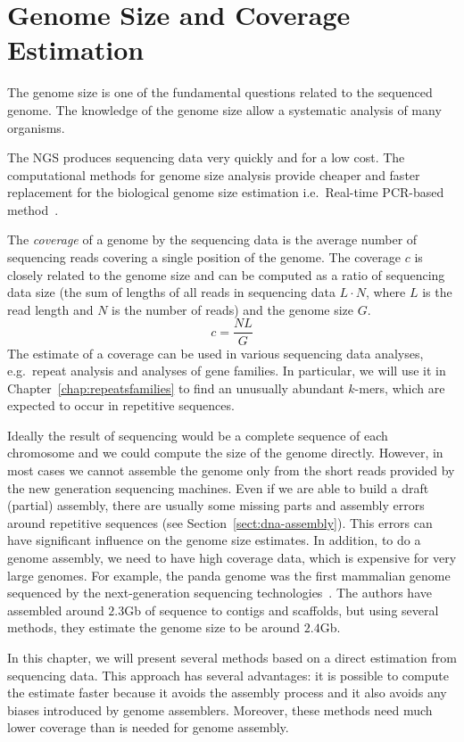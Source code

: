 \chapter{Genome Size and Coverage Estimation}
\label{chap:genomesize}

The genome size is one of the fundamental questions related to the sequenced genome. The knowledge of the genome size allow a systematic analysis of many organisms.

The NGS produces sequencing data very quickly and for a low cost.
The computational methods for genome size analysis provide cheaper and faster replacement for the biological genome size estimation i.e.\ Real-time PCR-based method~\cite{wilhelm2003real}.

The \emph{coverage} of a genome by the sequencing data is the average number of sequencing reads covering a single position of the genome. The coverage $c$ is closely related to the genome size and can be computed as a ratio of sequencing data size (the sum of lengths of all reads in sequencing data $L\cdot N$, where $L$ is the read length and $N$ is the number of reads) and the genome size $G$.
$$c = \frac{NL}{G}$$
The estimate of a coverage can be used in various sequencing data analyses, e.g.\ repeat analysis and analyses of gene families. In particular, we will use it in Chapter~\ref{chap:repeatsfamilies} to find an unusually abundant $k$-mers, which are expected to occur in repetitive sequences.

Ideally the result of sequencing would be a complete sequence of each chromosome and we could compute the size of the genome directly.
However, in most cases we cannot assemble the genome only from the short reads provided by the new generation sequencing machines.
Even if we are able to build a draft (partial) assembly, there are usually some missing parts and assembly errors around repetitive sequences (see Section~\ref{sect:dna-assembly}). This errors can have significant influence on the genome size estimates. In addition, to do a genome assembly, we need to have high coverage data, which is expensive for very large genomes. For example, the panda genome was the first mammalian genome sequenced
by the next-generation sequencing technologies~\cite{li2010panda}. The authors have assembled around $2.3$Gb of sequence to contigs and scaffolds, but using
several methods, they estimate the genome size to be around $2.4$Gb.

In this chapter, we will present several methods based on a direct estimation from sequencing data. This approach has several advantages: it is possible to compute the estimate faster because it avoids the assembly process and it also avoids any biases introduced by genome assemblers. Moreover, these methods need much lower coverage than is needed for genome assembly.


